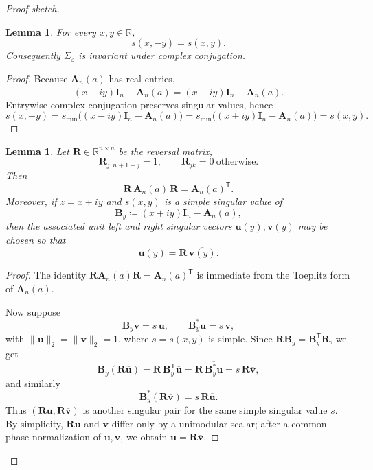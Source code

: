 \documentclass[11pt]{article}
\newtheorem{lemma}[theorem]{Lemma}
\begin{document}
\begin{proof}[Proof sketch]
\begin{lemma}\label{lem:conjugation-symmetry}
For every \(x,y\in\mathbb R\),
\[
s(x,-y)=s(x,y).
\]
Consequently \(\Sigma_\varepsilon\) is invariant under complex conjugation.
\end{lemma}

\begin{proof}
Because \(\mathbf A_n(a)\) has real entries,
\[
\overline{(x+iy)\mathbf I_n-\mathbf A_n(a)}
=
(x-iy)\mathbf I_n-\mathbf A_n(a).
\]
Entrywise complex conjugation preserves singular values, hence
\[
s(x,-y)
=
s_{\min}\!\bigl((x-iy)\mathbf I_n-\mathbf A_n(a)\bigr)
=
s_{\min}\!\bigl((x+iy)\mathbf I_n-\mathbf A_n(a)\bigr)
=
s(x,y).
\]
\end{proof}

\begin{lemma}\label{lem:persymmetry}
Let \(\mathbf R\in\mathbb R^{n\times n}\) be the reversal matrix,
\[
\mathbf R_{j,n+1-j}=1,\qquad \mathbf R_{jk}=0\ \text{otherwise}.
\]
Then
\[
\mathbf R\,\mathbf A_n(a)\,\mathbf R=\mathbf A_n(a)^{\mathsf T}.
\]
Moreover, if \(z=x+iy\) and \(s(x,y)\) is a simple singular value of
\[
\mathbf B_y\coloneqq (x+iy)\mathbf I_n-\mathbf A_n(a),
\]
then the associated unit left and right singular vectors \(\mathbf u(y),\mathbf v(y)\) may be chosen so that
\[
\mathbf u(y)=\mathbf R\,\overline{\mathbf v(y)}.
\]
\end{lemma}

\begin{proof}
The identity \(\mathbf R\mathbf A_n(a)\mathbf R=\mathbf A_n(a)^{\mathsf T}\) is immediate from the
Toeplitz form of \(\mathbf A_n(a)\).

Now suppose
\[
\mathbf B_y\mathbf v=s\,\mathbf u,
\qquad
\mathbf B_y^*\mathbf u=s\,\mathbf v,
\]
with \(\|\mathbf u\|_2=\|\mathbf v\|_2=1\), where \(s=s(x,y)\) is simple.
Since \(\mathbf R\mathbf B_y=\mathbf B_y^{\mathsf T}\mathbf R\), we get
\[
\mathbf B_y(\mathbf R\overline{\mathbf u})
=
\mathbf R\,\mathbf B_y^{\mathsf T}\overline{\mathbf u}
=
\mathbf R\,\overline{\mathbf B_y^*\mathbf u}
=
s\,\mathbf R\overline{\mathbf v},
\]
and similarly
\[
\mathbf B_y^*(\mathbf R\overline{\mathbf v})=s\,\mathbf R\overline{\mathbf u}.
\]
Thus \((\mathbf R\overline{\mathbf u},\mathbf R\overline{\mathbf v})\) is another singular pair for the same
simple singular value \(s\). By simplicity, \(\mathbf R\overline{\mathbf u}\) and \(\mathbf v\) differ only by a
unimodular scalar; after a common phase normalization of \(\mathbf u,\mathbf v\), we obtain
\(\mathbf u=\mathbf R\overline{\mathbf v}\).
\end{proof}


\end{proof}
\end{document}
